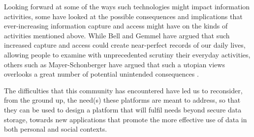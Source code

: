 \documentclass{sig-alternate}
\begin{document}
Looking forward at some of the ways such technologies might impact information activities, some have looked at the possible consequences and implications that ever-increasing information capture and access might have on the kinds of activities mentioned above. While Bell and Gemmel have argued \cite{bell2010total} that such increased capture and access could create near-perfect records of our daily lives, allowing people to examine with unprecedented scrutiny their everyday activities, others such as Mayer-Schonberger have argued that such a utopian views overlooks a great number of potential unintended consequences \cite{mayer-schonberger2013}.  



The difficulties that this community has encountered have led us to reconsider, from the ground up, the need(s) these platforms are meant to address, so that they can be used to design a platform that will fulfil needs beyond secure data storage, towards new applications that promote the more effective use of data in both personal and social contexts.
\end{document}
